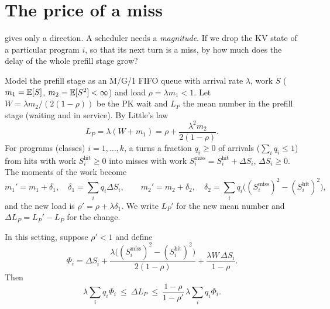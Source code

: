 \section{The price of a miss}

 gives only a direction. A scheduler needs a \emph{magnitude}.
If we drop the KV state of a particular program $i$, so that its next turn is a
miss, by how much does the delay of the whole prefill stage grow?

Model the prefill stage as an M/G/1 FIFO queue with arrival rate $\lambda$, work
$S$ ($m_1=\mathbb{E}[S]$, $m_2=\mathbb{E}[S^2]<\infty$) and load $\rho=\lambda m_1<1$. Let
$W=\lambda m_2/(2(1-\rho))$ be the PK wait and $L_P$ the mean number in the
prefill stage (waiting and in service). By Little's law
\begin{equation}\label{L3:eq:LP}
  L_P=\lambda(W+m_1)=\rho+\frac{\lambda^2m_2}{2(1-\rho)}.
\end{equation}
For programs (classes) $i=1,\dots,k$, a  turns a fraction
$q_i\ge0$ of arrivals ($\sum_iq_i\le1$) from hits with work
$S_i^{\mathrm{hit}}\ge0$ into misses with work
$S_i^{\mathrm{miss}}=S_i^{\mathrm{hit}}+\Delta S_i$, $\Delta S_i\ge0$. The moments of
the work become
\[
  m_1'=m_1+\delta_1,\quad \delta_1=\sum_iq_i\Delta S_i,\qquad
  m_2'=m_2+\delta_2,\quad \delta_2=\sum_iq_i\bigl((S_i^{\mathrm{miss}})^2-(S_i^{\mathrm{hit}})^2\bigr),
\]
and the new load is $\rho'=\rho+\lambda\delta_1$. We write $L_P'$ for the new mean
number and $\Delta L_P=L_P'-L_P$ for the change.

\begin{theorem}\label{thm:price}
In this setting, suppose $\rho'<1$ and define
\begin{equation}\label{L3:eq:price}
  \Phi_i=\Delta S_i
  +\frac{\lambda\bigl((S_i^{\mathrm{miss}})^2-(S_i^{\mathrm{hit}})^2\bigr)}{2(1-\rho)}
  +\frac{\lambda W\,\Delta S_i}{1-\rho}.
\end{equation}
Then
\[
  \lambda\sum_iq_i\Phi_i\ \le\ \Delta L_P\ \le\ \frac{1-\rho}{1-\rho'}\,\lambda\sum_iq_i\Phi_i .
\]
\end{theorem}

